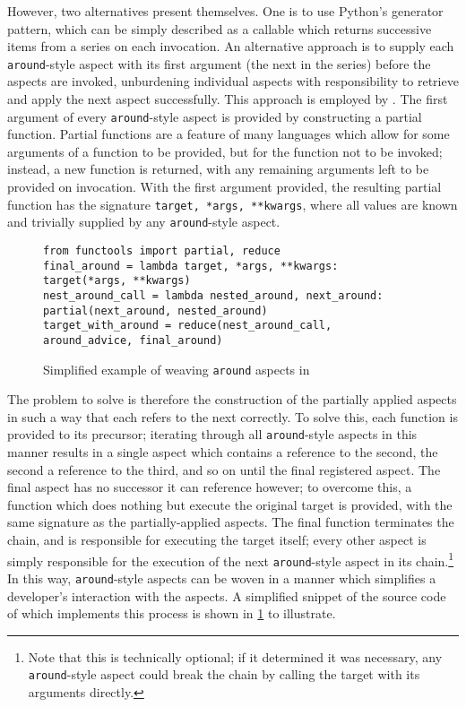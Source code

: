 However, two alternatives present themselves. One is to use Python's generator
pattern, which can be simply described as a callable which returns successive
items from a series on each invocation. An alternative approach is to supply
each \lstinline{around}-style aspect with its first argument (the next in the
series) before the aspects are invoked, unburdening individual aspects with
responsibility to retrieve and apply the next aspect successfully. This approach
is employed by \pdsf{}. The first argument of every \lstinline{around}-style
aspect is provided by constructing a partial function. Partial functions are a
feature of many languages which allow for some arguments of a function to be
provided, but for the function not to be invoked; instead, a new function is
returned, with any remaining arguments left to be provided on invocation. With
the first argument provided, the resulting partial function has the signature
\lstinline{target, *args, **kwargs}, where all values are known and trivially
supplied by any \lstinline{around}-style aspect.

\begin{figure}
    \begin{lstlisting}
from functools import partial, reduce
final_around = lambda target, *args, **kwargs: target(*args, **kwargs)
nest_around_call = lambda nested_around, next_around: partial(next_around, nested_around)
target_with_around = reduce(nest_around_call, around_advice, final_around)
    \end{lstlisting}
    \caption{Simplified example of weaving \lstinline{around} aspects in \pdsf}
    \label{fig:around_aspect_weaving_codesnippet}
\end{figure}

The problem to solve is therefore the construction of the partially applied
aspects in such a way that each refers to the next correctly. To solve this,
each function is provided to its precursor; iterating through all
\lstinline{around}-style aspects in this manner results in a single aspect which
contains a reference to the second, the second a reference to the third, and so
on until the final registered aspect. The final aspect has no successor it can
reference however; to overcome this, a function which does nothing but execute
the original target is provided, with the same signature as the
partially-applied aspects. The final function terminates the chain, and is
responsible for executing the target itself; every other aspect is simply
responsible for the execution of the next \lstinline{around}-style aspect in its
chain.\footnote{Note that this is technically optional; if it determined it was
necessary, any \lstinline{around}-style aspect could break the chain by calling
the target with its arguments directly.} In this way, \lstinline{around}-style
aspects can be woven in a manner which simplifies a developer's interaction with
the aspects. A simplified snippet of the source code of \pdsf which implements
this process is shown in \cref{fig:around_aspect_weaving_codesnippet} to
illustrate.

